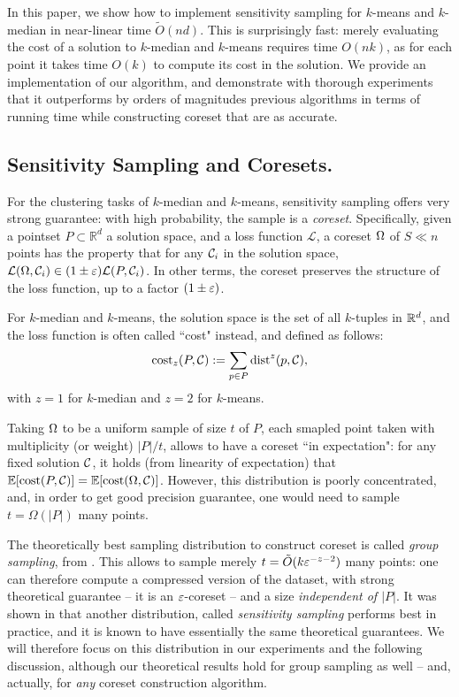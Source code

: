 In this paper, we show how to implement sensitivity sampling for $k$-means and $k$-median in near-linear time $\tilde O(nd)$.
This is surprisingly fast: merely evaluating the cost of a solution to $k$-median and $k$-means requires time $O(nk)$, as for each point it takes time $O(k)$ to compute its cost in the solution. 
We provide an implementation of our algorithm, and demonstrate with thorough experiments that it outperforms by orders of magnitudes previous algorithms in terms of running time while constructing coreset that are as accurate. 



\subsection{Sensitivity Sampling and Coresets.}
For the clustering tasks of $k$-median and $k$-means, sensitivity sampling offers very strong guarantee: with high probability, the sample is a \textit{coreset}.
Specifically, given a pointset $P \subset \mathbb{R}^{d}$
a solution space, and a loss function $\mathcal{L}$, a coreset $\Omega$ of $S \ll n$ points has the property that for any $\mathcal C_i$ in the solution space, $\mathcal{L}(\Omega,
\mathcal C_i) \in (1 \pm \varepsilon) \mathcal{L}(P, \mathcal C_i)$. In other terms, the coreset preserves the structure of the loss function, up to a factor $(1\pm \varepsilon)$.

For $k$-median and $k$-means, the solution space is the set of all $k$-tuples in $\mathbb{R}^d$, and the loss function is often called ``cost" instead, and defined as follows:
\[\operatorname{cost}_z(P, \mathcal C) := \sum_{p \in P} \operatorname{dist}^z(p, \mathcal C),\]
with $z=1$ for $k$-median and $z=2$ for $k$-means.

Taking $\Omega$ to be a uniform sample of size $t$ of $P$, each smapled point taken with multiplicity (or weight) $|P|/t$, allows to have a coreset ``in expectation": for any fixed solution $\mathcal C$, it holds (from linearity of expectation) that $\mathbb{E}[\operatorname{cost}(P, \mathcal C)] = \mathbb{E}[\operatorname{cost}(\Omega, \mathcal C)]$. However, this distribution is poorly concentrated, and, in order to get good precision guarantee, one would need to sample $t = \Omega(|P|)$ many points. 

The theoretically best sampling distribution to construct coreset is called \textit{group sampling}, from \cite{stoc21}. This allows to sample merely $t = \tilde O(k \varepsilon^{-z - 2})$ many points: one can therefore compute a compressed version of the dataset, with strong theoretical guarantee -- it is an $\varepsilon$-coreset -- and a size \textit{independent of $|P|$}.
It was shown in \cite{chrisESA} that another distribution, called \textit{sensitivity sampling} performs best in practice, and it is known to have essentially the same theoretical guarantees. We will therefore focus on this distribution in our experiments and the following discussion, although our theoretical results hold for group sampling as well -- and, actually, for \textit{any} coreset construction algorithm.

